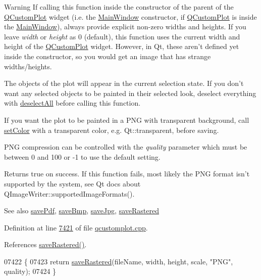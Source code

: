 \begin{DoxyWarning}{Warning}
If calling this function inside the constructor of the parent of the \hyperlink{a00030_d8/d00/a00186}{Q\+Custom\+Plot} widget (i.\+e. the \hyperlink{a00017}{Main\+Window} constructor, if \hyperlink{a00030_d8/d00/a00186}{Q\+Custom\+Plot} is inside the \hyperlink{a00017}{Main\+Window}), always provide explicit non-\/zero widths and heights. If you leave {\itshape width} or {\itshape height} as 0 (default), this function uses the current width and height of the \hyperlink{a00030_d8/d00/a00186}{Q\+Custom\+Plot} widget. However, in Qt, these aren't defined yet inside the constructor, so you would get an image that has strange widths/heights.
\end{DoxyWarning}
The objects of the plot will appear in the current selection state. If you don't want any selected objects to be painted in their selected look, deselect everything with \hyperlink{a00116_a9d4808ab925b003054085246c92a257c}{deselect\+All} before calling this function.

If you want the plot to be painted in a P\+N\+G with transparent background, call \hyperlink{a00116_a858bbcf98637471449e438304a00624b}{set\+Color} with a transparent color, e.\+g. Qt\+::transparent, before saving.

P\+N\+G compression can be controlled with the {\itshape quality} parameter which must be between 0 and 100 or -\/1 to use the default setting.

Returns true on success. If this function fails, most likely the P\+N\+G format isn't supported by the system, see Qt docs about Q\+Image\+Writer\+::supported\+Image\+Formats().

\begin{DoxySeeAlso}{See also}
\hyperlink{a00116_a84e33ad7492180f20ff520e557ed102d}{save\+Pdf}, \hyperlink{a00116_a6629d9e8e6da4bf18055ee0257fdce9a}{save\+Bmp}, \hyperlink{a00116_a490c722092d1771e8ce4a7a73dfd84ab}{save\+Jpg}, \hyperlink{a00116_ab528b84cf92baabe29b1d0ef2f77c93e}{save\+Rastered} 
\end{DoxySeeAlso}


Definition at line \hyperlink{a00115_source_l07421}{7421} of file \hyperlink{a00115_source}{qcustomplot.\+cpp}.



References \hyperlink{a00115_source_l08146}{save\+Rastered()}.


\begin{DoxyCode}
07422 \{  
07423   \textcolor{keywordflow}{return} \hyperlink{a00116_ab528b84cf92baabe29b1d0ef2f77c93e}{saveRastered}(fileName, width, height, scale, \textcolor{stringliteral}{"PNG"}, quality);
07424 \}
\end{DoxyCode}


